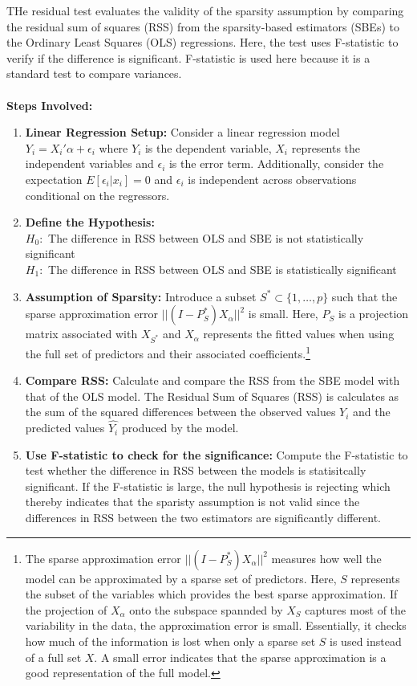 THe residual test evaluates the validity of the sparsity assumption by comparing the residual sum of squares (RSS) from the sparsity-based estimators (SBEs) to the Ordinary Least Squares (OLS) regressions. Here, the test uses F-statistic to verify if the difference is significant. F-statistic is used here because it is a standard test to compare variances.  \\
\\
\textbf{Steps Involved:}
\begin{enumerate}
    \item \textbf{Linear Regression Setup:} Consider a linear regression model $Y_i = X_i{\prime}\alpha + \epsilon_i$ where $Y_i$ is the dependent variable, $X_i$ represents the independent variables and $\epsilon_i$ is the error term. Additionally, consider the expectation $E[\epsilon_i | x_i] = 0$ and $\epsilon_i$ is independent across observations conditional on the regressors. 
    \item \textbf{Define the Hypothesis:} \\
    $H_0:$ The difference in RSS between OLS and SBE is not statistically significant\\
    $H_1:$ The difference in RSS between OLS and SBE is statistically significant
    \item \textbf{Assumption of Sparsity:} Introduce a subset $S^* \subset \{1, \dots, p\}$ such that the sparse approximation error $||(I - P_{S}^*)X_\alpha||^2$ is small. Here, $P_S$ is a projection matrix associated with $X_{S^*}$ and $X_\alpha$ represents the fitted values when using the full set of predictors and their associated coefficients.\footnote{The sparse approximation error $||(I - P_{S}^*)X_\alpha||^2$ measures how well the model can be approximated by a sparse set of predictors. Here, $S$ represents the subset of the variables which provides the best sparse approximation. If the projection of $X_\alpha$ onto the subspace spannded by $X_S$ captures most of the variability in the data, the approximation error is small. Essentially, it checks how much of the information is lost when only a sparse set $S$ is used instead of a full set $X$. A small error indicates that the sparse approximation is a good representation of the full model.}
    \item \textbf{Compare RSS:} Calculate and compare the RSS from the SBE model with that of the OLS model. The Residual Sum of Squares (RSS) is calculates as the sum of the squared differences between the observed values $Y_i$ and the predicted values $\hat{Y_i}$ produced by the model. 
    \item \textbf{Use F-statistic to check for the significance:} Compute the F-statistic to test whether the difference in RSS between the models is statisitcally significant.
    If the F-statistic is large, the null hypothesis is rejecting which thereby indicates that the sparisty assumption is not valid since the differences in RSS between the two estimators are significantly different. 
    

\end{enumerate}
